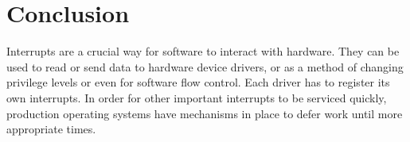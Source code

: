 \documentclass[10pt,conference,draftclsnofoot,onecolumn]{IEEEtran}
\begin{document}
\section{Conclusion}
Interrupts are a crucial way for software to interact with hardware. They can be used to read or send data to hardware device drivers, or as a method of changing privilege levels or even for software flow control. Each driver has to register its own interrupts. In order for other important interrupts to be serviced quickly, production operating systems have mechanisms in place to defer work until more appropriate times.



\clearpage
\printbibliography

\clearpage

\begin{appendices}


\end{appendices}
\end{document}
